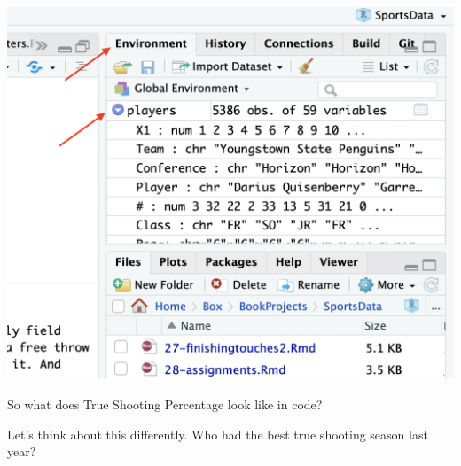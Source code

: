 \documentclass[]{book}
\newenvironment{Shaded}{\begin{snugshade}}{\end{snugshade}}
\newcommand{\KeywordTok}[1]{\textcolor[rgb]{0.13,0.29,0.53}{\textbf{#1}}}
\newcommand{\DataTypeTok}[1]{\textcolor[rgb]{0.13,0.29,0.53}{#1}}
\newcommand{\DecValTok}[1]{\textcolor[rgb]{0.00,0.00,0.81}{#1}}
\newcommand{\StringTok}[1]{\textcolor[rgb]{0.31,0.60,0.02}{#1}}
\newcommand{\OperatorTok}[1]{\textcolor[rgb]{0.81,0.36,0.00}{\textbf{#1}}}
\newcommand{\NormalTok}[1]{#1}
\begin{document}
\includegraphics[width=18.14in]{images/environment}

So what does True Shooting Percentage look like in code?

Let's think about this differently. Who had the best true shooting
season last year?

\begin{Shaded}
\end{Shaded}
\end{document}
